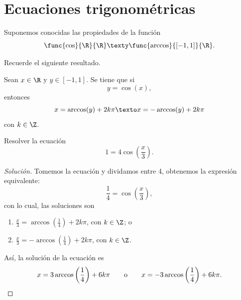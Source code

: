\documentclass[compacto,10pt,comentarios]{aleph-notas}
\begin{document}
\encabezado

\section{Ecuaciones trigonométricas}

\begin{advertencia}
    Suponemos conocidas las propiedades de la función 
    \[
        \func{\cos}{\R}{\R}
        \texty
        \func{\arccos}{[-1,1]}{\R}.
    \]
\end{advertencia}

Recuerde el siguiente resultado.

\begin{teo}
    Sean $x\in \R$ y $y\in [-1,1]$. Se tiene que si
    \[
        y =\cos(x),
    \]
    entonces
    \[
        x = \arccos(y) + 2k\pi
        \texto
        x = -\arccos(y) + 2k\pi
    \]
    con $k\in\Z$.
\end{teo}

\begin{ejer}
    Resolver la ecuación
    \[
        1=4\cos\left(\frac{x}{3}\right).
    \]
\end{ejer}

\begin{proof}[Solución]
    Tomemos la ecuación y dividamos entre 4, obtenemos la expresión equivalente:
    \[
        \frac{1}{4}=\cos\left(\frac{x}{3}\right),
    \]
    con lo cual, las soluciones son
    \begin{enumerate}[label=\textit{\alph*)}]
        \item\label{ej01:c01} $\displaystyle \frac{x}{3}=\arccos\left(\frac{1}{4}\right)+2k\pi$, con $k\in\Z$; o
        \item\label{ej01:c02} $\displaystyle \frac{x}{3}=-\arccos\left(\frac{1}{4}\right)+2k\pi$, con $k\in\Z$.
    \end{enumerate}
    Así, la solución de la ecuación es
    \[
        x=3\arccos\left(\frac{1}{4}\right)+6k\pi
        \qquad\text{o}\qquad
        x=-3\arccos\left(\frac{1}{4}\right)+6k\pi.\qedhere
    \]
\end{proof}
\end{document}
